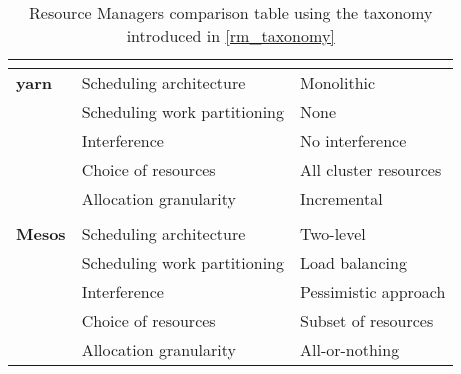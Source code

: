 \begin{table}[h]
\begin{center}
\begin{tabular}{lll}
\multicolumn{3}{c}{} \\ \hline
\multicolumn{1}{l|}{\textbf{\glsdesc*{yarn}}}
                                   & Scheduling architecture      & Monolithic              \\ \cline{2-3} 
\multicolumn{1}{l|}{}              & Scheduling work partitioning & None                    \\ \cline{2-3} 
\multicolumn{1}{l|}{}              & Interference                 & No interference         \\ \cline{2-3} 
\multicolumn{1}{l|}{}              & Choice of resources          & All cluster resources   \\ \cline{2-3} 
\multicolumn{1}{l|}{}              & Allocation granularity       & Incremental              \\ \cline{2-3}

\multicolumn{3}{c}{} \\ \hline
\multicolumn{1}{l|}{\textbf{Mesos \cite{mesos}}} 
                                   & Scheduling architecture      & Two-level               \\ \cline{2-3} 
\multicolumn{1}{l|}{}              & Scheduling work partitioning & Load balancing          \\ \cline{2-3} 
\multicolumn{1}{l|}{}              & Interference                 & Pessimistic approach    \\ \cline{2-3} 
\multicolumn{1}{l|}{}              & Choice of resources          & Subset of resources     \\ \cline{2-3} 
\multicolumn{1}{l|}{}              & Allocation granularity       & All-or-nothing                    

\end{tabular}
\end{center}
\caption{Resource Managers comparison table using the taxonomy introduced in \autoref{rm_taxonomy}}
\label{rm-comparison-table}
\end{table}